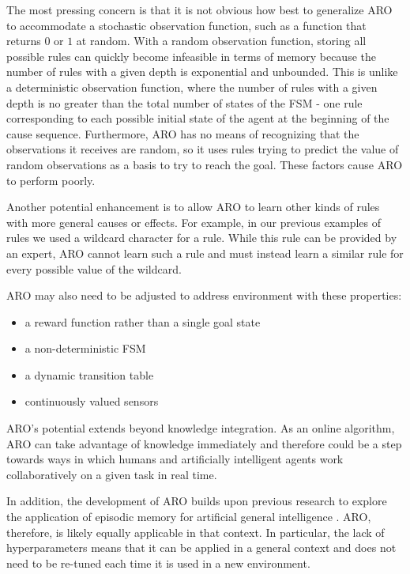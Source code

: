 \documentclass[letterpaper]{article} %
\begin{document}
The most pressing concern is that it is not obvious how best to
generalize ARO to accommodate a stochastic observation function, such
as a function that returns $0$ or $1$ at random. With a random
observation function, storing all possible rules can quickly become
infeasible in terms of memory because the number of rules with a given
depth is exponential and unbounded. This is unlike a deterministic
observation function, where the number of rules with a given depth is
no greater than the total number of states of the FSM - one rule
corresponding to each possible initial state of the agent at the
beginning of the cause sequence. Furthermore, ARO has no means of
recognizing that the observations it receives are random, so it uses
rules trying to predict the value of random observations as a basis to
try to reach the goal. These factors cause ARO to perform poorly.

Another potential enhancement is to allow ARO to learn other kinds of
rules with more general causes or effects. For example, in our
previous examples of rules we used a wildcard character for a
rule. While this rule can be provided by an expert, ARO cannot learn
such a rule and must instead learn a similar rule for every possible
value of the wildcard.

ARO may also need to be adjusted to address environment with these
properties:
\begin{itemize}
\item a reward function rather than a single goal state
\item a non-deterministic FSM
\item a dynamic transition table
\item continuously valued sensors
\end{itemize}

ARO's potential extends beyond knowledge integration.  As an online
algorithm, ARO can take advantage of knowledge immediately and
therefore could be a step towards ways in which humans and artificially
intelligent agents work collaboratively on a given task in real time.

In addition, the development of ARO builds upon previous research to
explore the application of episodic memory for artificial general
intelligence \cite{Rodriguez17}.  ARO, therefore, is likely equally
applicable in that context.  In particular, the lack of
hyperparameters means that it can be applied in a general context and
does not need to be re-tuned each time it is used in a new
environment.



\begin{quote}
\begin{small}


\end{small}
\end{quote}
\end{document}
